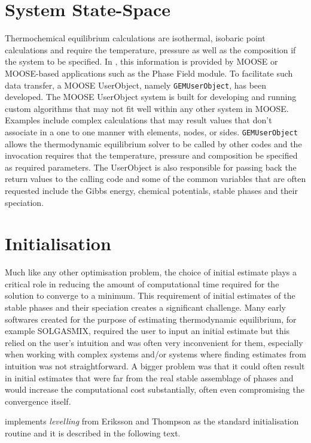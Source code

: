 \section{System State-Space}
	Thermochemical equilibrium calculations are isothermal, isobaric point calculations and require the temperature, pressure as well as the composition if the system to be specified. In {\GEM}, this information is provided by MOOSE or MOOSE-based applications such as the Phase Field module. To facilitate such data transfer, a MOOSE UserObject, namely \texttt{GEMUserObject}, has been developed. The MOOSE UserObject system is built for developing and running custom algorithms that may not fit well within any other system in MOOSE. Examples include complex calculations that may result values that don't associate in a one to one manner with elements, nodes, or sides. \texttt{GEMUserObject} allows the thermodynamic equilibrium solver to be called by other codes and the invocation requires that the temperature, pressure and composition be specified as required parameters. The UserObject is also responsible for passing back the return values to the calling code and some of the common variables that are often requested include the Gibbs energy, chemical potentials, stable phases and their speciation.

\section{Initialisation}
	Much like any other optimisation problem, the choice of initial estimate plays a critical role in reducing the amount of computational time required for the solution to converge to a minimum. This requirement of initial estimates of the stable  phases and their speciation creates a significant challenge. Many early softwares created for the purpose of estimating thermodynamic equilibrium, for example SOLGASMIX, required the user to input an initial estimate but this relied on the user's intuition and was often very inconvenient for them, especially when working with complex systems and/or systems where finding estimates from intuition was not straightforward. A bigger problem was that it could often result in initial estimates that were far from the real stable assemblage of phases and would increase the computational cost substantially, often even compromising the convergence itself. 

    {\GEM} implements \emph{levelling} from Eriksson and Thompson \cite{Eriksson89} as the standard initialisation routine and it is described in the following text.
	
